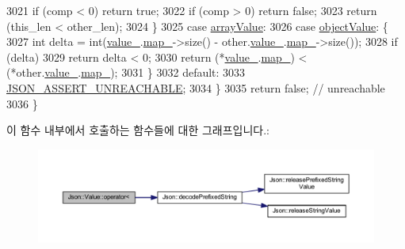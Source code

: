 \begin{DoxyCode}
3021     \textcolor{keywordflow}{if} (comp < 0) \textcolor{keywordflow}{return} \textcolor{keyword}{true};
3022     \textcolor{keywordflow}{if} (comp > 0) \textcolor{keywordflow}{return} \textcolor{keyword}{false};
3023     \textcolor{keywordflow}{return} (this\_len < other\_len);
3024   \}
3025   \textcolor{keywordflow}{case} \hyperlink{namespace_json_a7d654b75c16a57007925868e38212b4eadc8f264f36b55b063c78126b335415f4}{arrayValue}:
3026   \textcolor{keywordflow}{case} \hyperlink{namespace_json_a7d654b75c16a57007925868e38212b4eae8386dcfc36d1ae897745f7b4f77a1f6}{objectValue}: \{
3027     \textcolor{keywordtype}{int} delta = int(\hyperlink{class_json_1_1_value_aef578244546212705b9f81eb84d7e151}{value\_}.\hyperlink{union_json_1_1_value_1_1_value_holder_a1e7a5b86d4f52234f55c847ad1ce389a}{map\_}->size() - other.\hyperlink{class_json_1_1_value_aef578244546212705b9f81eb84d7e151}{value\_}.\hyperlink{union_json_1_1_value_1_1_value_holder_a1e7a5b86d4f52234f55c847ad1ce389a}{map\_}->size());
3028     \textcolor{keywordflow}{if} (delta)
3029       \textcolor{keywordflow}{return} delta < 0;
3030     \textcolor{keywordflow}{return} (*\hyperlink{class_json_1_1_value_aef578244546212705b9f81eb84d7e151}{value\_}.\hyperlink{union_json_1_1_value_1_1_value_holder_a1e7a5b86d4f52234f55c847ad1ce389a}{map\_}) < (*other.\hyperlink{class_json_1_1_value_aef578244546212705b9f81eb84d7e151}{value\_}.\hyperlink{union_json_1_1_value_1_1_value_holder_a1e7a5b86d4f52234f55c847ad1ce389a}{map\_});
3031   \}
3032   \textcolor{keywordflow}{default}:
3033     \hyperlink{jsoncpp_8cpp_aa5e619e3e9388f6376a344dd8462c9cc}{JSON\_ASSERT\_UNREACHABLE};
3034   \}
3035   \textcolor{keywordflow}{return} \textcolor{keyword}{false}; \textcolor{comment}{// unreachable}
3036 \}
\end{DoxyCode}
이 함수 내부에서 호출하는 함수들에 대한 그래프입니다.\+:\nopagebreak
\begin{figure}[H]
\begin{center}
\leavevmode
\includegraphics[width=350pt]{class_json_1_1_value_aac6bd14155b88ed2d39ef54820b39e49_cgraph}
\end{center}
\end{figure}
\mbox{\label{class_json_1_1_value_a40c411a320a416d5eac0052b36211286}} 
